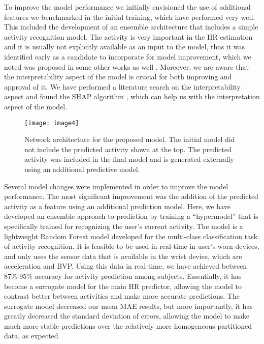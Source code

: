 \documentclass[12pt, conference]{IEEEtran}
\begin{document}
To improve the model performance we initially envisioned the use of additional features we benchmarked in the initial training, which have performed very well. This included the development of an ensemble architecture that includes a simple activity recognition model. The activity is very important in the HR estimation and it is usually not explicitly available as an input to the model, thus it was identified early as a candidate to incorporate for model improvement, which we noted was proposed in some other works as well \cite{brophy2020optimised}. Moreover, we are aware that the interpretability aspect of the model is crucial for both improving and approval of it. We have performed a literature search on the interpretability aspect and found the SHAP algorithm \cite{lundberg2017unified}, which can help us with the interpretation aspect of the model.

\begin{figure*}[!t]
  \centering
  \texttt{[image: image4]}
  \caption{Network architecture for the proposed model. The initial model did not include the predicted activity shown at the top. The predicted activity was included in the final model and is generated externally using an additional predictive model.}
  \label{fig_3}
  \end{figure*}

Several model changes were implemented in order to improve the model performance. The most significant improvement was the addition of the predicted activity as a feature using an additional prediction model. Here, we have developed an ensemble approach to prediction by training a “hypermodel” that is specifically trained for recognizing the user’s current activity. The model is a lightweight Random Forest model developed for the multi-class classification task of activity recognition. It is feasible to be used in real-time in user’s worn devices, and only uses the sensor data that is available in the wrist device, which are acceleration and BVP. Using this data in real-time, we have achieved between 87\%-95\% accuracy for activity prediction among subjects. Essentially, it has become a surrogate model for the main HR predictor, allowing the model to contrast better between activities and make more accurate predictions. The surrogate model decreased our mean MAE results, but more importantly, it has greatly decreased the standard deviation of errors, allowing the model to make much more stable predictions over the relatively more homogeneous partitioned data, as expected.
\end{document}
